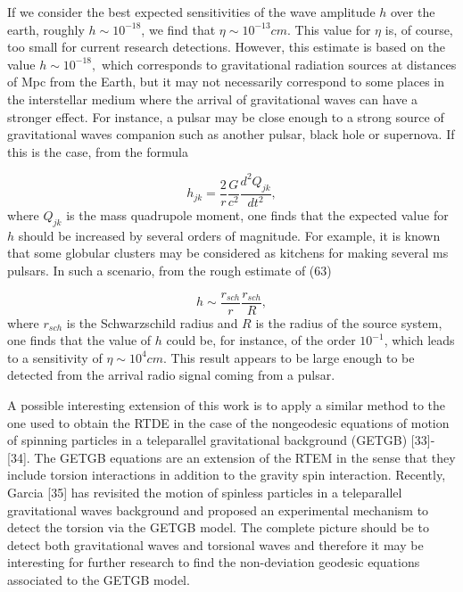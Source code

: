\documentclass[a4paper,12pt]{article}
\begin{document}
If we consider the best expected sensitivities of the wave amplitude $h$
over the earth, roughly $h\sim 10^{-18}$, we find that $\eta \sim
10^{-13}cm. $ This value for $\eta $ is, of course, too small for current
research detections. However, this estimate is based on the value $h\sim
10^{-18},$ which corresponds to gravitational radiation sources at distances
of Mpc from the Earth, but it may not necessarily correspond to some places
in the interstellar medium where the arrival of gravitational waves can have
a stronger effect. For instance, a pulsar may be close enough to a strong
source of gravitational waves companion such as another pulsar, black hole
or supernova. If this is the case, from the formula

\begin{equation}
h_{jk}=\frac{2}{r}\frac{G}{c^{2}}\frac{d^{2}Q_{jk}}{dt^{2}},  \label{63}
\end{equation}
where $Q_{jk}$ is the mass quadrupole moment, one finds that the expected
value for $h$ should be increased by several orders of magnitude. For
example, it is known that some globular clusters may be considered as
kitchens for making several ms pulsars. In such a scenario, from the rough
estimate of (63)

\begin{equation}
h\sim \frac{r_{sch}}{r}\frac{r_{sch}}{R},  \label{64}
\end{equation}
where $r_{sch}$ is the Schwarzschild radius and $R$ is the radius of the
source system, one finds that the value of $h$ could be, for instance, of
the order $10^{-1}$, which leads to a sensitivity of $\eta \sim 10^{4}cm.$
This result appears to be large enough to be detected from the arrival radio
signal coming from a pulsar.

A possible interesting extension of this work is to apply a similar method
to the one used to obtain the RTDE in the case of the nongeodesic equations
of motion of spinning particles in a teleparallel gravitational background
(GETGB) [33]-[34]. The GETGB equations are an extension of the RTEM in the
sense that they include torsion interactions in addition to the gravity spin
interaction. Recently, Garcia [35] has revisited the motion of spinless
particles in a teleparallel gravitational waves background and proposed an
experimental mechanism to detect the torsion via the GETGB model. The
complete picture should be to detect both gravitational waves and torsional
waves and therefore it may be interesting for further research to find the
non-deviation geodesic equations associated to the GETGB model.
\end{document}
